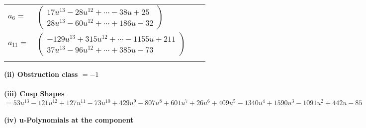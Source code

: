 \documentclass[1p]{elsarticle_modified}
\theoremstyle{definition}
\begin{document}
\begin{tabular}{m{7pt} m{180pt} m{7pt} m{180pt} }
\flushright $a_{6}=$&$\begin{pmatrix}17 u^{13}-28 u^{12}+\cdots-38 u+25\\28 u^{13}-60 u^{12}+\cdots+186 u-32\end{pmatrix}$ \\
\flushright $a_{11}=$&$\begin{pmatrix}-129 u^{13}+315 u^{12}+\cdots-1155 u+211\\37 u^{13}-96 u^{12}+\cdots+385 u-73\end{pmatrix}$\\&\end{tabular}
\flushleft \textbf{(ii) Obstruction class $= -1$}\\~\\
\flushleft \textbf{(iii) Cusp Shapes $= 53 u^{13}-121 u^{12}+127 u^{11}-73 u^{10}+429 u^9-807 u^8+601 u^7+26 u^6+409 u^5-1340 u^4+1590 u^3-1091 u^2+442 u-85$}\\~\\
\newpage\renewcommand{\arraystretch}{1}
\flushleft \textbf{(iv) u-Polynomials at the component}\newline \\
\end{document}

